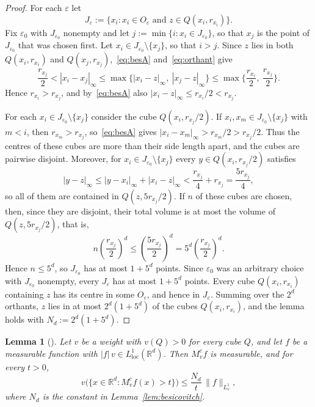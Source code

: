\documentclass[12pt]{article}
\newtheorem{lemma}{Lemma}
\begin{document}
\begin{proof}
For each $\varepsilon$ let
\[
  J_\varepsilon := \{ x_i : x_i \in O_\varepsilon \text{ and } z \in Q(x_i, r_{x_i}) \}.
\]
Fix $\varepsilon_0$ with $J_{\varepsilon_0}$ nonempty and let $j := \min\{ i : x_i \in J_{\varepsilon_0} \}$, so that $x_j$ is the point of $J_{\varepsilon_0}$ that was chosen first. Let $x_i \in J_{\varepsilon_0} \setminus \{x_j\}$, so that $i > j$. Since $z$ lies in both $Q(x_i, r_{x_i})$ and $Q(x_j, r_{x_j})$,~\eqref{eq:besA} and~\eqref{eq:orthant} give
\[
  \frac{r_{x_j}}{2} < |x_i - x_j|_\infty \le \max\{ |x_i - z|_\infty,\ |x_j - z|_\infty \} \le \max\Big\{ \frac{r_{x_i}}{2},\ \frac{r_{x_j}}{2} \Big\}.
\]
Hence $r_{x_i} > r_{x_j}$, and by~\eqref{eq:besA} also $|x_i - z|_\infty \le r_{x_i}/2 < r_{x_j}$.

For each $x_i \in J_{\varepsilon_0} \setminus \{x_j\}$ consider the cube $Q(x_i, r_{x_j}/2)$. If $x_i, x_m \in J_{\varepsilon_0} \setminus \{x_j\}$ with $m < i$, then $r_{x_m} > r_{x_j}$, so~\eqref{eq:besA} gives $|x_i - x_m|_\infty > r_{x_m}/2 > r_{x_j}/2$. Thus the centres of these cubes are more than their side length apart, and the cubes are pairwise disjoint. Moreover, for $x_i \in J_{\varepsilon_0} \setminus \{x_j\}$ every $y \in Q(x_i, r_{x_j}/2)$ satisfies
\[
  |y - z|_\infty \le |y - x_i|_\infty + |x_i - z|_\infty < \frac{r_{x_j}}{4} + r_{x_j} = \frac{5 r_{x_j}}{4},
\]
so all of them are contained in $Q(z, 5r_{x_j}/2)$. If $n$ of these cubes are chosen, then, since they are disjoint, their total volume is at most the volume of $Q(z, 5r_{x_j}/2)$, that is,
\[
  n \left( \frac{r_{x_j}}{2} \right)^d \le \left( \frac{5 r_{x_j}}{2} \right)^d = 5^d \left( \frac{r_{x_j}}{2} \right)^d .
\]
Hence $n \le 5^d$, so $J_{\varepsilon_0}$ has at most $1 + 5^d$ points. Since $\varepsilon_0$ was an arbitrary choice with $J_{\varepsilon_0}$ nonempty, every $J_\varepsilon$ has at most $1 + 5^d$ points. Every cube $Q(x_i, r_{x_i})$ containing $z$ has its centre in some $O_\varepsilon$, and hence in $J_\varepsilon$. Summing over the $2^d$ orthants, $z$ lies in at most $2^d(1 + 5^d)$ of the cubes $Q(x_i, r_{x_i})$, and the lemma holds with $N_d := 2^d(1 + 5^d)$.
\end{proof}

\begin{lemma}[{\cite[Theorem~1.10]{Duoandikoetxea2013}}]\label{lem:weak}
Let $v$ be a weight with $v(Q) > 0$ for every cube $Q$, and let $f$ be a measurable function with $|f|\,v \in L^1_{\mathrm{loc}}(\mathbb{R}^d)$. Then $M^c_v f$ is measurable, and for every $t > 0$,
\[
  v\big(\{x \in \mathbb{R}^d : M^c_v f(x) > t\}\big) \le \frac{N_d}{t}\, \|f\|_{L^1_v},
\]
where $N_d$ is the constant in Lemma~\ref{lem:besicovitch}.
\end{lemma}
\end{document}
